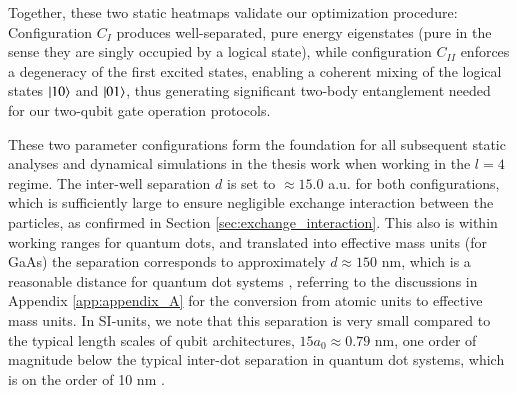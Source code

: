 \documentclass{subfiles}
\begin{document}
Together, these two static heatmaps validate our optimization procedure: Configuration $C_I$ produces well-separated, pure energy eigenstates (pure in the sense they are singly occupied by a logical state), while configuration $C_{II}$ enforces a degeneracy of the first excited states, enabling a coherent mixing of the logical states $\ket{10}$ and $\ket{01}$, thus generating significant two-body entanglement needed for our two-qubit gate operation protocols.


These two parameter configurations form the foundation for all subsequent static analyses and dynamical simulations in the thesis work when working in the $l=4$ regime. The inter-well separation $d$ is set to $\approx 15.0$ a.u. for both configurations, which is sufficiently large to ensure negligible exchange interaction between the particles, as confirmed in Section \ref{sec:exchange_interaction}. This also is within working ranges for quantum dots, and translated into effective mass units (for GaAs) the separation corresponds to approximately $d \approx 150$ nm, which is a reasonable distance for quantum dot systems \cite{garcia2021semiconductor}, referring to the discussions in Appendix \ref{app:appendix_A} for the conversion from atomic units to effective mass units. In SI-units, we note that this separation is very small compared to the typical length scales of qubit architectures, $15 a_0 \approx 0.79$ nm, one order of magnitude below the typical inter-dot separation in quantum dot systems, which is on the order of 10 nm \cite{garcia2021semiconductor}. 
\end{document}
